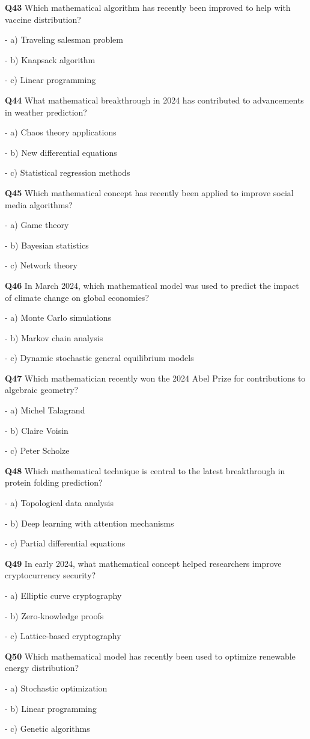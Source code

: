 \textbf{Q43} Which mathematical algorithm has recently been improved to help with vaccine distribution?\par
\quad - a) Traveling salesman problem\par
\quad - b) Knapsack algorithm\par
\quad - c) Linear programming\par

\textbf{Q44} What mathematical breakthrough in 2024 has contributed to advancements in weather prediction?\par
\quad - a) Chaos theory applications\par
\quad - b) New differential equations\par
\quad - c) Statistical regression methods\par

\textbf{Q45} Which mathematical concept has recently been applied to improve social media algorithms?\par
\quad - a) Game theory\par
\quad - b) Bayesian statistics\par
\quad - c) Network theory\par

\textbf{Q46} In March 2024, which mathematical model was used to predict the impact of climate change on global economies?\par
\quad - a) Monte Carlo simulations\par
\quad - b) Markov chain analysis\par
\quad - c) Dynamic stochastic general equilibrium models\par

\textbf{Q47} Which mathematician recently won the 2024 Abel Prize for contributions to algebraic geometry?\par
\quad - a) Michel Talagrand\par
\quad - b) Claire Voisin\par
\quad - c) Peter Scholze\par

\textbf{Q48} Which mathematical technique is central to the latest breakthrough in protein folding prediction?\par
\quad - a) Topological data analysis\par
\quad - b) Deep learning with attention mechanisms\par
\quad - c) Partial differential equations\par

\textbf{Q49} In early 2024, what mathematical concept helped researchers improve cryptocurrency security?\par
\quad - a) Elliptic curve cryptography\par
\quad - b) Zero‑knowledge proofs\par
\quad - c) Lattice‑based cryptography\par

\textbf{Q50} Which mathematical model has recently been used to optimize renewable energy distribution?\par
\quad - a) Stochastic optimization\par
\quad - b) Linear programming\par
\quad - c) Genetic algorithms\par